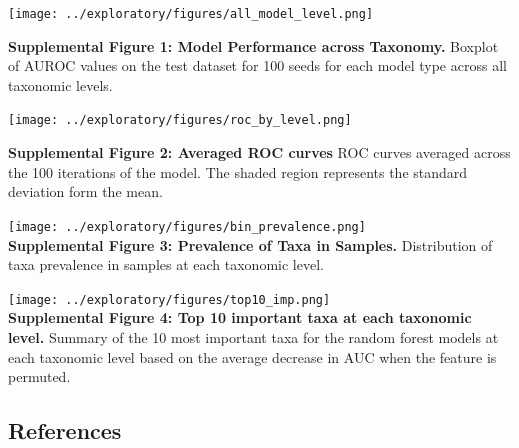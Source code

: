 \documentclass[
]{article}
\begin{document}
\texttt{[image: ../exploratory/figures/all\_model\_level.png]}

\textbf{Supplemental Figure 1: Model Performance across Taxonomy.}
Boxplot of AUROC values on the test dataset for 100 seeds for each model
type across all taxonomic levels.

\newpage

\texttt{[image: ../exploratory/figures/roc\_by\_level.png]}

\textbf{Supplemental Figure 2: Averaged ROC curves} ROC curves averaged
across the 100 iterations of the model. The shaded region represents the
standard deviation form the mean.

\newpage

\texttt{[image: ../exploratory/figures/bin\_prevalence.png]}\\
\textbf{Supplemental Figure 3: Prevalence of Taxa in Samples.}
Distribution of taxa prevalence in samples at each taxonomic level.

\newpage

\texttt{[image: ../exploratory/figures/top10\_imp.png]}\\
\textbf{Supplemental Figure 4: Top 10 important taxa at each taxonomic
level.} Summary of the 10 most important taxa for the random forest
models at each taxonomic level based on the average decrease in AUC when
the feature is permuted.

\newpage

\hypertarget{references}{%
\subsection*{References}\label{references}}
\end{document}
